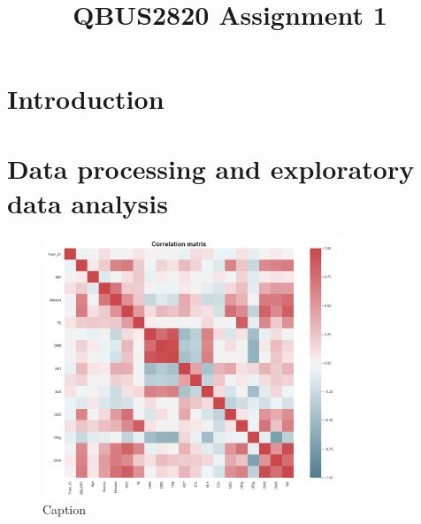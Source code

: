 \documentclass[letterpaper,12pt,twoside,]{pinp}
\title{QBUS2820 Assignment 1}
\author[]{}
\begin{document}
\verticaladjustment{-2pt}

\maketitle
\thispagestyle{firststyle}



\hypertarget{introduction}{%
\section{Introduction}\label{introduction}}

\hypertarget{data-processing-and-exploratory-data-analysis}{%
\section{Data processing and exploratory data
analysis}\label{data-processing-and-exploratory-data-analysis}}

\begin{figure}[H]
\includegraphics[width=0.8\textwidth]{corr_matrix.png}
\caption{Caption}
\label{fig:figure2}
\end{figure}
\end{document}
